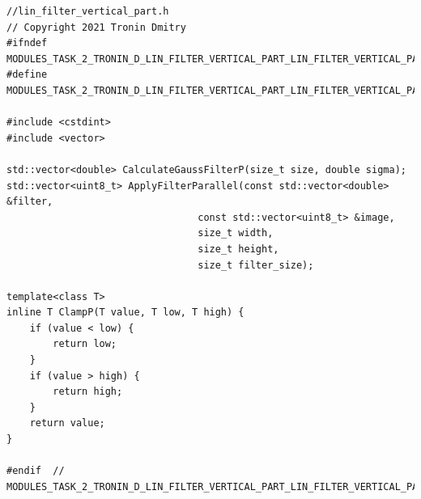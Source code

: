 \documentclass{report}
\begin{document}
\begin{lstlisting}[breaklines=true]
//lin_filter_vertical_part.h
// Copyright 2021 Tronin Dmitry
#ifndef MODULES_TASK_2_TRONIN_D_LIN_FILTER_VERTICAL_PART_LIN_FILTER_VERTICAL_PART_H_
#define MODULES_TASK_2_TRONIN_D_LIN_FILTER_VERTICAL_PART_LIN_FILTER_VERTICAL_PART_H_

#include <cstdint>
#include <vector>

std::vector<double> CalculateGaussFilterP(size_t size, double sigma);
std::vector<uint8_t> ApplyFilterParallel(const std::vector<double> &filter,
                                 const std::vector<uint8_t> &image,
                                 size_t width,
                                 size_t height,
                                 size_t filter_size);

template<class T>
inline T ClampP(T value, T low, T high) {
    if (value < low) {
        return low;
    }
    if (value > high) {
        return high;
    }
    return value;
}

#endif  // MODULES_TASK_2_TRONIN_D_LIN_FILTER_VERTICAL_PART_LIN_FILTER_VERTICAL_PART_H_
\end{lstlisting}
\end{document}
